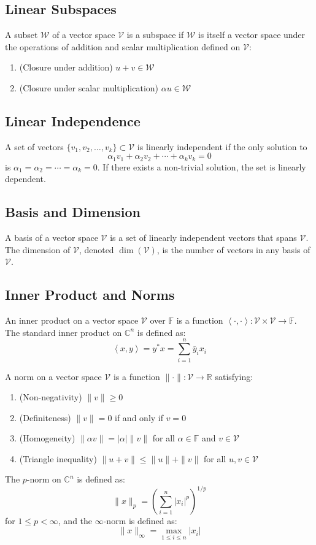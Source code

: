 \documentclass[11pt]{article}
\newcommand{\inner}[2]{\left\langle #1, #2 \right\rangle}
\begin{document}
\subsection{Linear Subspaces}
A subset $\mathcal{W}$ of a vector space $\mathcal{V}$ is a subspace if $\mathcal{W}$ is itself a vector space under the operations of addition and scalar multiplication defined on $\mathcal{V}$:
\begin{enumerate}
    \item (Closure under addition) $u + v \in \mathcal{W}$
    \item (Closure under scalar multiplication) $\alpha u \in \mathcal{W}$
\end{enumerate}

\subsection{Linear Independence}
A set of vectors $\{v_1, v_2, \ldots, v_k\} \subset \mathcal{V}$ is linearly independent if the only solution to
\[\alpha_1 v_1 + \alpha_2 v_2 + \cdots + \alpha_k v_k = 0\]
is $\alpha_1 = \alpha_2 = \cdots = \alpha_k = 0$. If there exists a non-trivial solution, the set is linearly dependent.

\subsection{Basis and Dimension}
A basis of a vector space $\mathcal{V}$ is a set of linearly independent vectors that spans $\mathcal{V}$. The dimension of $\mathcal{V}$, denoted $\dim(\mathcal{V})$, is the number of vectors in any basis of $\mathcal{V}$. 

\subsection{Inner Product and Norms}
An inner product on a vector space $\mathcal{V}$ over $\mathbb{F}$ is a function $\inner{\cdot}{\cdot} : \mathcal{V} \times \mathcal{V} \to \mathbb{F}$. The standard inner product on $\mathbb{C}^n$ is defined as:
\[\inner{x}{y} = y^* x = \sum_{i=1}^{n} \bar{y}_i x_i\]

A norm on a vector space $\mathcal{V}$ is a function $\|\cdot\| : \mathcal{V} \to \mathbb{R}$ satisfying:
\begin{enumerate}
    \item (Non-negativity) $\|v\| \geq 0$
    \item (Definiteness) $\|v\| = 0$ if and only if $v = 0$
    \item (Homogeneity) $\|\alpha v\| = |\alpha| \|v\|$ for all $\alpha \in \mathbb{F}$ and $v \in \mathcal{V}$
    \item (Triangle inequality) $\|u + v\| \leq \|u\| + \|v\|$ for all $u, v \in \mathcal{V}$
\end{enumerate}
The $p$-norm on $\mathbb{C}^n$ is defined as:
\[\|x\|_p = \left( \sum_{i=1}^{n} |x_i|^p \right)^{1/p}\]
for $1 \leq p < \infty$, and the $\infty$-norm is defined as:
\[\|x\|_\infty = \max_{1 \leq i \leq n} |x_i|\]
\end{document}
